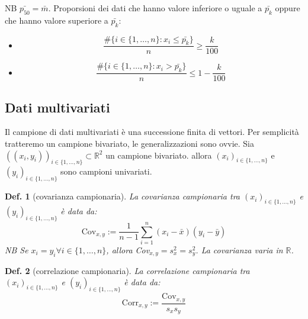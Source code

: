 \documentclass{article}
\newtheorem{definition}{Def.}[section]
\begin{document}
NB $\bar{p_{50}} = \bar{m}$.
Proporsioni dei dati che hanno valore inferiore o uguale a $\bar{p_k}$ oppure
che hanno valore superiore a $\bar{p_k}$:
\begin{itemize}
	\item
		\begin{equation}
			\frac{\#\{i \in \{1, \dots, n\}: x_i \leq \bar{p_k}\}}{n} \geq \frac{k}{100}
		\end{equation}

	\item
		\begin{equation}
			\frac{\#\{i \in \{1, \dots, n\}: x_i > \bar{p_k}\}}{n} \leq 1 - \frac{k}{100}
		\end{equation}
\end{itemize}

\subsection{Dati multivariati}
Il campione di dati multivariati è una successione finita di vettori. Per
semplicità tratteremo un campione bivariato, le generalizzazioni sono ovvie.
Sia $((x_i, y_i))_{i \in \{1, \dots, n\}} \subset \mathbb{R}^2$ un campione bivariato.
allora $(x_i)_{i \in \{1, \dots, n\}}$ e $(y_i)_{i \in \{1, \dots, n\}}$ sono
campioni univariati.

\begin{definition}[covarianza campionaria] La covarianza campionaria tra $(x_i)_{i \in 
\{1, \dots, n\}}$ e $(y_i)_{i \in \{1, \dots, n\}}$ è data da:
\begin{equation}
	\text{Cov}_{x,y} := \frac{1}{n-1} \sum_{i=1}^n (x_i - \bar{x})(y_i - \bar{y})
\end{equation}
NB Se $x_i = y_i \forall i \in \{1, \dots, n\}$, allora Cov$_{x,y} = s_x^2 = s_y^2$.
La covarianza varia in $\mathbb{R}$.
\end{definition}

\begin{definition}[correlazione campionaria] La correlazione campionaria tra $(x_i)_{i
\in \{1, \dots, n\}}$ e $(y_i)_{i \in \{1, \dots, n\}}$ è data da:
\begin{equation}
	\text{Corr}_{x,y} := \frac{\text{Cov}_{x,y}}{s_x s_y}
\end{equation}
\end{definition}
\end{document}
